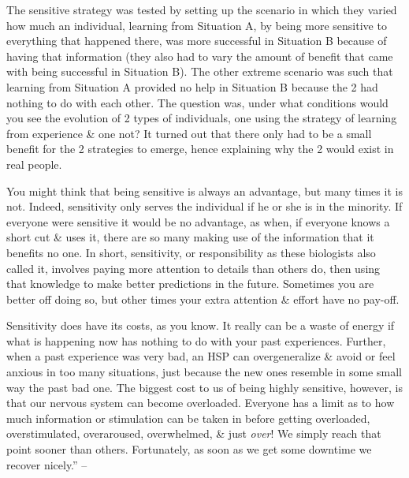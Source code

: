 \documentclass{article}
\numberwithin{equation}{section}
\begin{document}
The sensitive strategy was tested by setting up the scenario in which they varied how much an individual, learning from Situation A, by being more sensitive to everything that happened there, was more successful in Situation B because of having that information (they also had to vary the amount of benefit that came with being successful in Situation B). The other extreme scenario was such that learning from Situation A provided no help in Situation B because the 2 had nothing to do with each other. The question was, under what conditions would you see the evolution of 2 types of individuals, one using the strategy of learning from experience \& one not? It turned out that there only had to be a small benefit for the 2 strategies to emerge, hence explaining why the 2 would exist in real people.

You might think that being sensitive is always an advantage, but many times it is not. Indeed, sensitivity only serves the individual if he or she is in the minority. If everyone were sensitive it would be no advantage, as when, if everyone knows a short cut \& uses it, there are so many making use of the information that it benefits no one. In short, sensitivity, or responsibility as these biologists also called it, involves paying more attention to details than others do, then using that knowledge to make better predictions in the future. Sometimes you are better off doing so, but other times your extra attention \& effort have no pay-off.

Sensitivity does have its costs, as you know. It really can be a waste of energy if what is happening now has nothing to do with your past experiences. Further, when a past experience was very bad, an HSP can overgeneralize \& avoid or feel anxious in too many situations, just because the new ones resemble in some small way the past bad one. The biggest cost to us of being highly sensitive, however, is that our nervous system can become overloaded. Everyone has a limit as to how much information or stimulation can be taken in before getting overloaded, overstimulated, overaroused, overwhelmed, \& just \textit{over}! We simply reach that point sooner than others. Fortunately, as soon as we get some downtime we recover nicely.'' -- \cite[pp. 14--16]{Aron2013}
\end{document}
